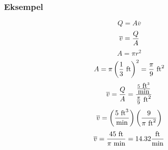 \documentclass[aspectratio=169,xcolor=dvipsnames]{beamer}
\begin{document}
%
%
\begin{frame}
	\frametitle{Eksempel}

	


%
$$Q = A \overline{v}$$
%
$$\overline{v} = {Q \over A}$$
%
%
$$A = \pi r^2$$
%
$$A = \pi \left({1 \over 3} \hbox{ ft}\right)^2 = {\pi \over 9} \hbox{ ft}^2$$
%
%
$$\overline{v} = {Q \over A} = {{5 \hbox{ ft}^3 \over \hbox{min}} \over {{\pi \over 9} \hbox{ ft}^2}}$$
%
$$\overline{v} = \left({5 \hbox{ ft}^3 \over \hbox{min}}\right) \left({9 \over {\pi \hbox{ ft}^2}}\right)$$
%
$$\overline{v} = {45 \hbox{ ft} \over \pi \hbox{ min}} = 14.32 {\hbox{ft} \over \hbox{min}}$$
%
\end{frame}
\end{document}
